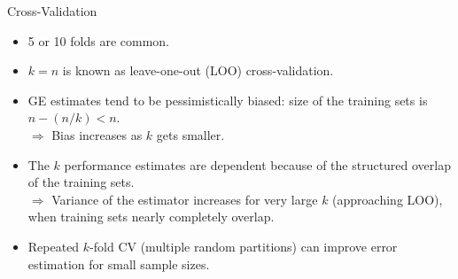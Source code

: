 \documentclass[11pt,compress,t,notes=noshow, xcolor=table]{beamer}
\begin{document}

\begin{vbframe}{Cross-Validation}

\begin{itemize}
  \item 5 or 10 folds are common.%
  \item $k = n$ is known as leave-one-out (LOO) cross-validation.
  \item GE estimates tend to be pessimistically biased: 
  size of the training sets is $ n- (n/k) < n$. \\
  $\Rightarrow$ Bias increases as $k$ gets smaller.
  \item The $k$ performance estimates are dependent because
  of the structured overlap of the training sets.\\
  $\Rightarrow$ Variance of the estimator increases for very large $k$ 
  (approaching LOO), when training sets nearly completely overlap.
  \item Repeated $k$-fold CV (multiple random partitions)
  can improve error estimation for small sample sizes.
\end{itemize}
\end{vbframe}

\end{document}
